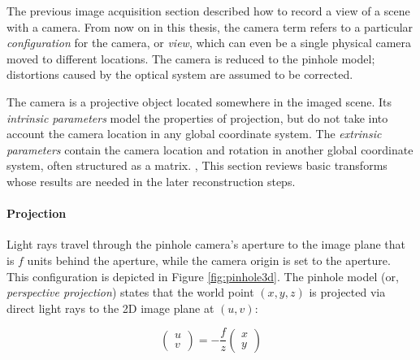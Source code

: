 
The previous image acquisition section described how to record a view of a scene with a camera.
From now on in this thesis, the camera term refers to a particular \emph{configuration} for the camera, or \emph{view}, which can even be a single physical camera moved to different locations.
The camera is reduced to the pinhole model; distortions caused by the optical system are assumed to be corrected.


The camera is a projective object located somewhere in the imaged scene.
Its \emph{intrinsic parameters} model the properties of projection, but do not take into account the camera location in any global coordinate system.
The \emph{extrinsic parameters} contain the camera location and rotation in another global coordinate system, often structured as a matrix.
\cite[p. 41]{hartley03multiview}, \cite{heyden2005multiple}
This section reviews basic transforms whose results are needed in the later reconstruction steps.


\paragraph{Projection}
Light rays travel through the pinhole camera's aperture to the image plane that is $f$ units behind the aperture, while the camera origin is set to the aperture.
\cite{hartley03multiview}
This configuration is depicted in Figure \ref{fig:pinhole3d}.
The pinhole model (or, \emph{perspective projection}) states that the world point $(x, y, z)$ is projected via direct light rays to the 2D image plane at $(u, v)$:

\begin{equation}
\begin{pmatrix}
u \\ v
\end{pmatrix}
=
-\frac{f}{z} \begin{pmatrix}
x \\ y
\end{pmatrix}
\end{equation}

